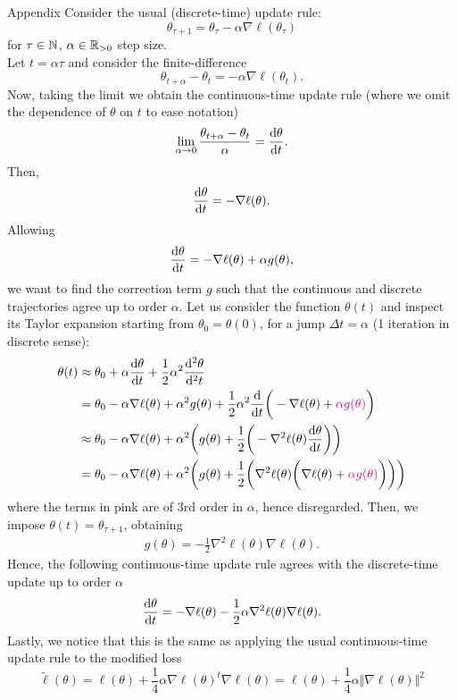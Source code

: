 \documentclass{beamer}
\begin{document}
\begin{frame}{Appendix}
    Consider the usual (discrete-time) update rule:
    \begin{equation*}
        \theta_{\tau+1} = \theta_\tau -\alpha\nabla\ell(\theta_\tau)
    \end{equation*}
for $\tau \in \mathbb{N}$, $\alpha\in\mathbb{R}_{>0}$ step size.
\\
Let $t=\alpha\tau$ and consider the finite-difference
\[
\theta_{t+\alpha} - \theta_t = -\alpha\nabla\ell(\theta_t).
\]
Now, taking the limit we obtain the continuous-time update rule (where we omit the dependence of $\theta$ on $t$ to ease notation)
\begin{align*}
\lim_{\alpha\to0} \frac{\theta_{t+\alpha} - \theta_t}{\alpha} = \frac{\mathop{}\!\mathrm{d} \theta}{\mathop{}\!\mathrm{d} t}.
\end{align*}
Then,
\begin{equation}
    \frac{\mathop{}\!\mathrm{d} \theta}{\mathop{}\!\mathrm{d} t}= -\nabla\ell(\theta).
\end{equation}
Allowing
\[
\frac{\mathop{}\!\mathrm{d} \theta}{\mathop{}\!\mathrm{d} t}= -\nabla\ell(\theta) + \alpha g(\theta),
\]
we want to find the correction term $g$ such that the continuous and discrete trajectories agree up to order $\alpha$.
Let us consider the function $\theta(t)$ and inspect its Taylor expansion starting from $\theta_0=\theta(0)$, for a jump $\Delta t=\alpha$ (1 iteration in discrete sense):
\begin{align*}
\theta(t) &\approx \theta_0 + \alpha \frac{\de \theta}{\de t}  + \frac{1}{2}\alpha^2 \frac{\de^2 \theta}{\de^2 t} \\
&= \theta_0 - \alpha \nabla\ell(\theta) + \alpha^2 g(\theta) + \frac{1}{2}\alpha^2 \frac{\de}{\de t} \bigg(-\nabla\ell(\theta) +{\color{magenta}\alpha g(\theta)}\bigg)\\
&\approx \theta_0 - \alpha \nabla\ell(\theta) + \alpha^2 \bigg(g(\theta) + \frac{1}{2}\bigg(-\nabla^2\ell(\theta)\frac{\de\theta}{\de t}\bigg)\bigg)\\
& = \theta_0 - \alpha \nabla\ell(\theta) + \alpha^2 \bigg(g(\theta) + \frac{1}{2}\bigg(\nabla^2\ell(\theta)\bigg(\nabla\ell(\theta) + {\color{magenta} \alpha g(\theta)}\bigg)\bigg)\bigg)
\end{align*}
where the terms in pink are of 3rd order in $\alpha$, hence disregarded.
Then, we impose $\theta(t) = \theta_{\tau+1}$, obtaining
\begin{align*}
    g(\theta) = -\frac{1}{2}\nabla^2\ell(\theta) \nabla\ell(\theta).
\end{align*}
Hence, the following continuous-time update rule agrees with the discrete-time update up to order $\alpha$
\begin{equation}
    \frac{\mathop{}\!\mathrm{d} \theta}{\mathop{}\!\mathrm{d} t} = -\nabla\ell(\theta) - \frac{1}{2}\alpha\nabla^2\ell(\theta)\nabla\ell(\theta).
\end{equation}
Lastly, we notice that this is the same as applying the usual continuous-time update rule to the modified loss
\begin{equation}
\tilde\ell(\theta) = \ell(\theta) + \frac{1}{4}\alpha\nabla\ell{(\theta)}^t \nabla\ell(\theta) = \ell(\theta) + \frac{1}{4}\alpha\big\Vert\nabla\ell(\theta) \big\Vert^2
\end{equation}
\end{frame}
\end{document}

